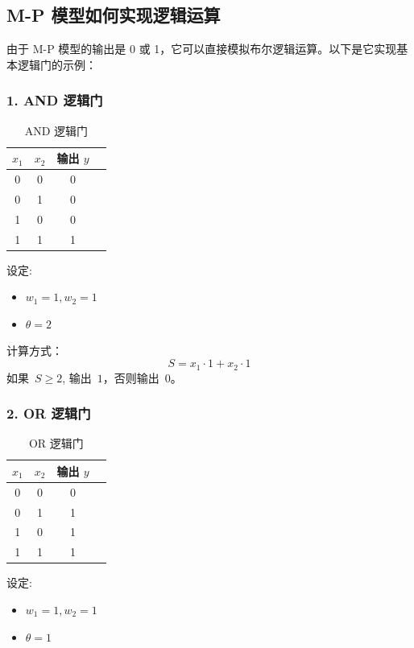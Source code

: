 \subsection{ M-P 模型如何实现逻辑运算}

由于 M-P 模型的输出是 0 或 1，它可以直接模拟布尔逻辑运算。以下是它实现基本逻辑门的示例：

\subsubsection*{\bf 1.  AND 逻辑门}

\begin{table}[htbp]
\centering
\caption{AND 逻辑门}
\begin{tabular}{|c|c|c|c|}
\hline
{\bf $x_1$} & $x_2$ & 输出 $y$ \\
\hline
0  & 0  & 0    \\
\hline
0  & 1  & 0    \\
\hline
1  & 0  & 0    \\
\hline
1  & 1  & 1    \\
\hline
\end{tabular}
\label{AND 逻辑门}
\end{table}

设定:
\begin{itemize}
\item $w_1 =1, w_2 =1$
\item $\theta =2$ 
\end{itemize}

计算方式：
$$ S= x_1 \cdot 1  + x_2 \cdot 1$$
如果~$ S\ge 2$, 输出~$1$，否则输出~$0$。

\subsubsection*{\bf 2.  OR 逻辑门}

\begin{table}[htbp]
\centering
\caption{OR 逻辑门}
\begin{tabular}{|c|c|c|c|}
\hline
{\bf $x_1$} & $x_2$ & 输出 $y$ \\
\hline
0  & 0  & 0    \\
\hline
0  & 1  & 1   \\
\hline
1  & 0  & 1    \\
\hline
1  & 1  & 1    \\
\hline
\end{tabular}
\label{OR 逻辑门}
\end{table}

设定:
\begin{itemize}
\item $w_1 =1, w_2 =1$
\item $\theta =1$ 
\end{itemize}

